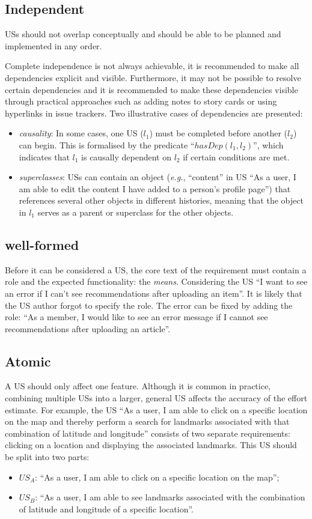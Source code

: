 \subsection*{\normalsize{Independent}}
USs should not overlap conceptually and should be able to be planned and implemented in any order. 

Complete independence is not always achievable, it is recommended to make all dependencies explicit and visible. Furthermore, it may not be possible to resolve certain dependencies and it is recommended to make these dependencies visible through practical approaches such as adding notes to story cards or using hyperlinks in issue trackers. Two illustrative cases of dependencies are presented:
\begin{itemize}
\item\emph{causality}: In some cases, one US ($l_1$) must be completed before another ($l_2$) can begin. This is formalised by the predicate \enquote{$hasDep(l_1, l_2)$}, which indicates that $l_1$ is causally dependent on $l_2$ if certain conditions are met.
\item\emph{superclasses}: USs can contain an object (\emph{e.g.}, \enquote{content} in US \enquote{As a user, I am able to edit the content I have added to a person's profile page}) that references several other objects in different histories, meaning that the object in $l_1$ serves as a parent or superclass for the other objects.
\end{itemize}
\subsection*{\normalsize{well-formed}}
Before it can be considered a US, the core text of the requirement must contain a role and the expected functionality: the \emph{means}. Considering the US \enquote{I want to see an error if I can't see recommendations after uploading an item}. It is likely that the US author forgot to specify the role. The error can be fixed by adding the role: \enquote{As a member, I would like to see an error message if I cannot see recommendations after uploading an article}.
\subsection*{\normalsize{Atomic}}
A US should only affect one feature. Although it is common in practice, combining multiple USs into a larger, general US affects the accuracy of the effort estimate\cite{liskin2014we}. For example, the US \enquote{As a user, I am able to click on a specific location on the map and thereby perform a search for landmarks associated with that combination of latitude and longitude} consists of two separate requirements: clicking on a location and displaying the associated landmarks. This US should be split into two parts:
\begin{itemize}
\item $US_A$: \enquote{As a user, I am able to click on a specific location on the map};
\item $US_B$: \enquote{As a user, I am able to see landmarks associated with the combination of latitude and longitude of a specific location}.
\end{itemize}
